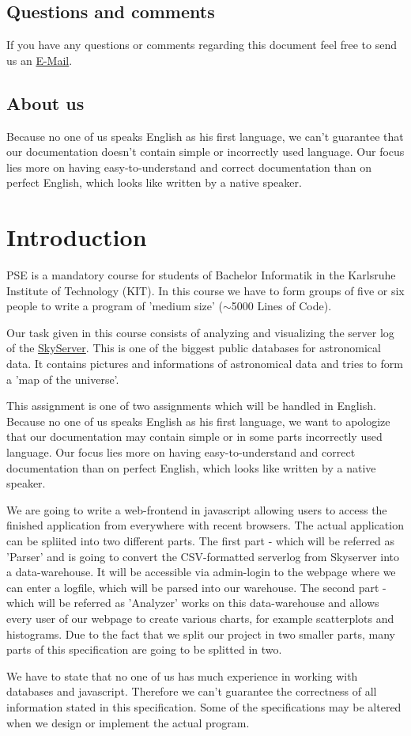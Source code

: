 \subsection*{Questions and comments}
If you have any questions or comments regarding this document feel free to send us an 
\href{mailto:pse10-group14-ws12@ira.uni-karlsruhe.de}{E-Mail}.


\subsection*{About us}
Because no one of us speaks English as his first language, 
we can't guarantee that our documentation doesn't contain simple 
or incorrectly used language. Our focus lies more on 
having easy-to-understand and correct documentation 
than on perfect English, which looks like written by a native speaker.

 
\newpage
\section*{Introduction} %
PSE is a mandatory course for students of Bachelor Informatik in the 
Karlsruhe Institute of Technology (KIT).
In this course we have to form groups of five or six people to write
 a program of 'medium size' ($\sim$5000 Lines of Code).

Our task given in this course consists of
analyzing and visualizing the server log of the 
\href{http://skyserver.sdss.org/public/en/}{SkyServer}.
This is one of the biggest public databases for astronomical data. 
It contains pictures and informations of astronomical data
and tries to form a 'map of the universe'.

This assignment is one of two assignments which will be handled 
in English.
Because no one of us speaks English as his first language, 
we want to apologize that our documentation may contain simple 
or in some parts incorrectly used language. Our focus lies more on 
having easy-to-understand and correct documentation 
than on perfect English, which looks like written by a native speaker.

We are going to write a web-frontend in javascript allowing users 
to access the finished application from everywhere
with recent browsers. The actual application can be spliited into two 
different parts. The first part - which will be referred as 'Parser' and is going to convert the CSV-formatted 
serverlog from Skyserver into a data-warehouse. It will
be accessible via admin-login to the webpage where we can enter a 
logfile, which will be parsed into our warehouse.
The second part - which will be referred as 'Analyzer' works on this data-warehouse 
and allows every user of our webpage to create various charts, 
for example scatterplots and histograms.
Due to the fact that we split our project in two smaller parts, 
many parts of this specification are going to be splitted in two.

We have to state that no one of us has much experience in working 
with databases and javascript.
Therefore we can't guarantee the correctness of all information 
stated in this specification. Some of the specifications may be altered when we design or 
implement the actual program.
